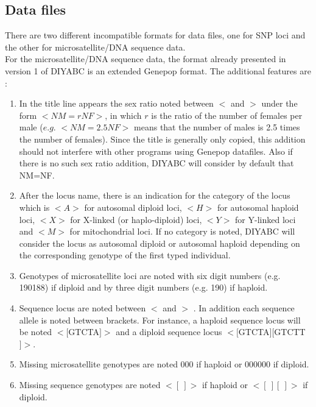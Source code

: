 \subsection{Data files}
There are two different incompatible formats for data files, one for SNP loci and the other for microsatellite/DNA sequence data.\\ For the microsatellite/DNA sequence data, the format already presented in version 1 of DIYABC is an extended Genepop format. The additional features are :
\begin{enumerate}
\item In the title line appears the sex ratio noted between \textsf{$<$} and \textsf{$>$} under the form \textsf{$<NM=rNF>$}, in which $r$ is the ratio of the number of females per male ($e.g.$ \textsf{$<NM=2.5NF>$} means that the number of males is 2.5 times the number of females). Since the title is generally only copied, this addition should not interfere with other programs using  Genepop datafiles. Also if there is no such sex ratio addition, DIYABC will consider by default that NM=NF.
\item After the locus name, there is an indication for the category of the locus which is $<A>$ for autosomal diploid loci, $<H>$ for autosomal haploid loci, $<X>$ for X-linked (or haplo-diploid) loci, $<Y>$ for Y-linked loci and $<M>$ for mitochondrial loci. If no category is noted, DIYABC will consider the locus as autosomal diploid or autosomal haploid depending on the corresponding genotype of the first typed individual.
\item Genotypes of microsatellite loci are noted with six digit numbers (e.g. 190188) if diploid and by three digit numbers (e.g. 190) if haploid.
\item Sequence locus are noted between  \textsf{$<$} and \textsf{$>$} . In addition each sequence allele is noted between brackets. For instance, a haploid sequence locus  will be noted $<[$GTCTA$]>$ and a diploid sequence locus $<[$GTCTA$][$GTCTT$]>$.
\item Missing microsatellite genotypes are noted \textsf{000} if haploid or \textsf{000000} if diploid.
\item Missing sequence genotypes are noted $<[\ ]>$ if haploid or $<[\ ][\ ]>$ if diploid.
\end{enumerate}

